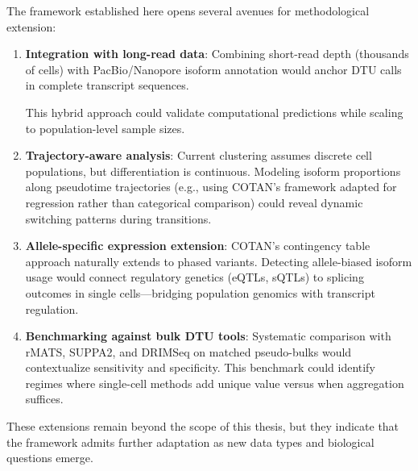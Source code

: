 The framework established here opens several avenues for methodological extension:
\begin{enumerate}
    \item \textbf{Integration with long-read data}: Combining short-read depth (thousands of cells) with PacBio/Nanopore isoform annotation would anchor DTU calls in complete transcript sequences.

This hybrid approach could validate computational predictions while scaling to population-level sample sizes.

    \item \textbf{Trajectory-aware analysis}: Current clustering assumes discrete cell populations, but differentiation is continuous. Modeling isoform proportions along pseudotime trajectories (e.g., using COTAN's framework adapted for regression rather than categorical comparison) could reveal dynamic switching patterns during transitions.

    \item \textbf{Allele-specific expression extension}: COTAN's contingency table approach naturally extends to phased variants. Detecting allele-biased isoform usage would connect regulatory genetics (eQTLs, sQTLs) to splicing outcomes in single cells---bridging population genomics with transcript regulation.

    \item \textbf{Benchmarking against bulk DTU tools}: Systematic comparison with rMATS, SUPPA2, and DRIMSeq \cite{love2018swimming, draper2025selecting} on matched pseudo-bulks would contextualize sensitivity and specificity. This benchmark could identify regimes where single-cell methods add unique value versus when aggregation suffices.
\end{enumerate}

These extensions remain beyond the scope of this thesis, but they indicate that the framework admits further adaptation as new data types and biological questions emerge.
